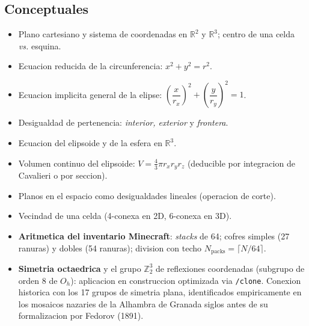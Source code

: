 \documentclass[12pt,a4paper]{scrartcl}
\newcommand{\acc}[1]{\textcolor{accent}{\textbf{#1}}}
\newcommand{\cmd}[1]{\textcolor{earth}{\texttt{\small #1}}}
\begin{document}
\subsection{Conceptuales}
\begin{itemize}[leftmargin=1.3em,itemsep=0.15em,topsep=0.3em]
  \item Plano cartesiano y sistema de coordenadas en $\mathbb{R}^2$ y $\mathbb{R}^3$; centro de una celda \emph{vs.} esquina.
  \item Ecuacion reducida de la circunferencia: $x^2 + y^2 = r^2$.
  \item Ecuacion implicita general de la elipse: $\left(\dfrac{x}{r_x}\right)^{\!2} + \left(\dfrac{y}{r_y}\right)^{\!2} = 1$.
  \item Desigualdad de pertenencia: \emph{interior, exterior} y \emph{frontera}.
  \item Ecuacion del elipsoide y de la esfera en $\mathbb{R}^3$.
  \item Volumen continuo del elipsoide: $V = \tfrac{4}{3}\pi r_x r_y r_z$ (deducible por integracion de Cavalieri o por seccion).
  \item Planos en el espacio como desigualdades lineales (operacion de corte).
  \item Vecindad de una celda (4-conexa en 2D, 6-conexa en 3D).
  \item \acc{Aritmetica del inventario Minecraft}: \emph{stacks} de 64; cofres simples (27 ranuras) y dobles (54 ranuras); division con techo $N_{\mathrm{packs}} = \lceil N/64 \rceil$.
  \item \acc{Simetria octaedrica} y el grupo $\mathbb{Z}_2^3$ de reflexiones coordenadas (subgrupo de orden 8 de $O_h$): aplicacion en construccion optimizada via \cmd{/clone}. Conexion historica con los 17 grupos de simetria plana, identificados empiricamente en los mosaicos nazaries de la Alhambra de Granada siglos antes de su formalizacion por Fedorov (1891).
\end{itemize}
\end{document}
